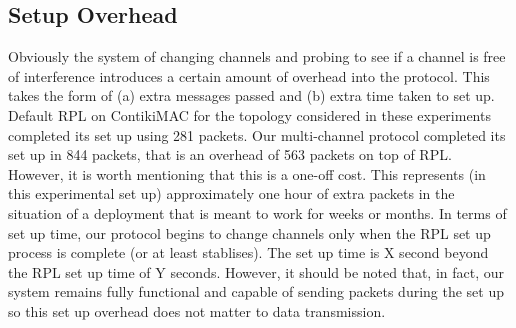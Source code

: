 \subsection{Setup Overhead}




Obviously the system of changing channels and probing to see if a channel is free of interference introduces a certain amount of overhead into
the protocol.  This takes the form of (a) extra messages passed and (b) extra time taken to set up.  Default RPL on ContikiMAC for the topology considered in these experiments completed its set up using 281 packets.  Our multi-channel protocol completed its set up in 844 packets, that is an overhead of 563 packets on top of RPL. However, it is worth mentioning that this is a one-off cost.  This represents (in this experimental set up) approximately one hour of extra packets in the situation of a deployment that is meant to work for weeks or months.  In terms of set up time, our protocol begins to change channels only when the RPL set up process is complete (or at least stablises).  The set up time is X second beyond the 
RPL set up time of Y seconds.  However, it should be noted that, in fact, our system remains fully functional and capable of sending packets during
the set up so this set up overhead does not matter to data transmission.
